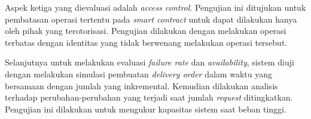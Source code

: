 Aspek ketiga yang dievaluasi adalah \textit{access control}. Pengujian ini ditujukan untuk pembatasan operasi tertentu pada \textit{smart contract} untuk dapat dilakukan hanya oleh pihak yang terotorisasi. Pengujian dilakukan dengan melakukan operasi terbatas dengan identitas yang tidak berwenang melakukan operasi tersebut.

Selanjutnya untuk melakukan evaluasi \textit{failure rate} dan \textit{availability}, sistem diuji dengan melakukan simulasi pembuatan \textit{delivery order} dalam waktu yang bersamaan dengan jumlah yang inkremental. Kemudian dilakukan analisis terhadap perubahan-perubahan yang terjadi saat jumlah \textit{request} ditingkatkan. Pengujian ini dilakukan untuk mengukur kapasitas sistem saat beban tinggi.
